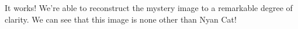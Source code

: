 \documentclass[11pt]{amsart}
\begin{document}
It works! We're able to reconstruct the mystery image 
to a remarkable degree of clarity. We can see that this image is none other than Nyan Cat! 





\end{document}
